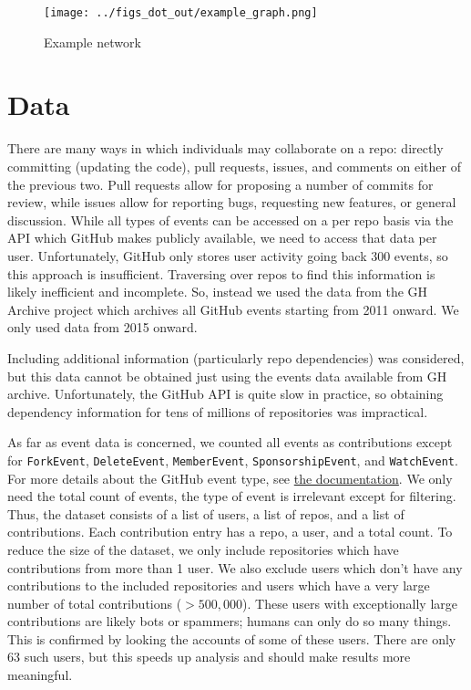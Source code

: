 \documentclass{pset}
\begin{document}
\begin{figure}[ht]
    \centering
    \texttt{[image: ../figs\_dot\_out/example\_graph.png]}
    \caption{Example network}%
\end{figure}


\section*{Data}

There are many ways in which individuals may collaborate on a repo: directly
committing (updating the code), pull requests, issues, and comments on either
of the previous two. Pull requests allow for proposing a number of commits for
review, while issues allow for reporting bugs, requesting new features, or
general discussion.  While all types of events can be
accessed on a per repo basis via the API which GitHub makes publicly available,
we need to access that data per user.  Unfortunately, GitHub only stores user
activity going back 300 events, so this approach is insufficient. Traversing
over repos to find this information is likely inefficient and incomplete. So,
instead we used the data from the GH Archive project which archives all GitHub
events starting from 2011 onward. We only used data from 2015 onward.

Including additional information (particularly repo dependencies) was considered,
but this data cannot be obtained just using the events data available from GH
archive. Unfortunately, the GitHub API is quite slow in practice, so
obtaining dependency information for tens of millions of repositories
was impractical.

As far as event data is concerned, 
we counted all events as contributions except for
\texttt{ForkEvent}, \texttt{DeleteEvent}, \texttt{MemberEvent},
\texttt{SponsorshipEvent}, and \texttt{WatchEvent}. For more
details about the GitHub event type, see \href{https://docs.github.com/en/developers/webhooks-and-events/github-event-types}{the documentation}.
We only need the total count of events, the type of event is irrelevant
except for filtering. Thus, the dataset consists of a list of users,
a list of repos, and a list of contributions. Each contribution entry has
a repo, a user, and a total count.
To reduce the size of the dataset, we only include repositories which have
contributions from more than 1 user. We also exclude users which don't have
any contributions to the included repositories and users which have a very
large number of total contributions ($> 500,000$). These users with 
exceptionally large contributions are likely bots or spammers; humans
can only do so many things. 
This is confirmed by looking the accounts of some of these users. There are
only 63 such users, but this speeds
up analysis and should make results more meaningful. 
\end{document}
